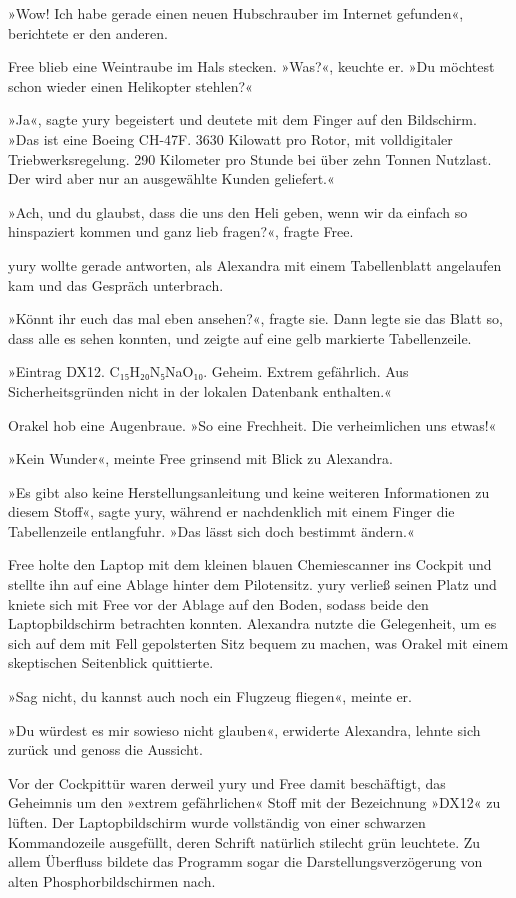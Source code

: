 »Wow! Ich habe gerade einen neuen Hubschrauber im Internet gefunden«, berichtete er den anderen.

Free blieb eine Weintraube im Hals stecken. »Was?«, keuchte er. »Du möchtest schon wieder einen Helikopter stehlen?«

»Ja«, sagte yury begeistert und deutete mit dem Finger auf den Bildschirm. »Das ist eine Boeing CH-47F. 3630 Kilowatt pro Rotor, mit volldigitaler Triebwerksregelung. 290 Kilometer pro Stunde bei über zehn Tonnen Nutzlast. Der wird aber nur an ausgewählte Kunden geliefert.«

»Ach, und du glaubst, dass die uns den Heli geben, wenn wir da einfach so hinspaziert kommen und ganz lieb fragen?«, fragte Free.

yury wollte gerade antworten, als Alexandra mit einem Tabellenblatt angelaufen kam und das Gespräch unterbrach.

»Könnt ihr euch das mal eben ansehen?«, fragte sie. Dann legte sie das Blatt so, dass alle es sehen konnten, und zeigte auf eine gelb markierte Tabellenzeile.

»Eintrag DX12. C₁₅H₂₀N₅NaO₁₀. Geheim. Extrem gefährlich. Aus Sicherheitsgründen nicht in der lokalen Datenbank enthalten.«

Orakel hob eine Augenbraue. »So eine Frechheit. Die verheimlichen uns etwas!«

»Kein Wunder«, meinte Free grinsend mit Blick zu Alexandra.

»Es gibt also keine Herstellungsanleitung und keine weiteren Informationen zu diesem Stoff«, sagte yury, während er nachdenklich mit einem Finger die Tabellenzeile entlangfuhr. »Das lässt sich doch bestimmt ändern.«

Free holte den Laptop mit dem kleinen blauen Chemiescanner ins Cockpit und stellte ihn auf eine Ablage hinter dem Pilotensitz. yury verließ seinen Platz und kniete sich mit Free vor der Ablage auf den Boden, sodass beide den Laptopbildschirm betrachten konnten. Alexandra nutzte die Gelegenheit, um es sich auf dem mit Fell gepolsterten Sitz bequem zu machen, was Orakel mit einem skeptischen Seitenblick quittierte.

»Sag nicht, du kannst auch noch ein Flugzeug fliegen«, meinte er.

»Du würdest es mir sowieso nicht glauben«, erwiderte Alexandra, lehnte sich zurück und genoss die Aussicht.

Vor der Cockpittür waren derweil yury und Free damit beschäftigt, das Geheimnis um den »extrem gefährlichen« Stoff mit der Bezeichnung »DX12« zu lüften. Der Laptopbildschirm wurde vollständig von einer schwarzen Kommandozeile ausgefüllt, deren Schrift natürlich stilecht grün leuchtete. Zu allem Überfluss bildete das Programm sogar die Darstellungsverzögerung von alten Phosphorbildschirmen nach.

